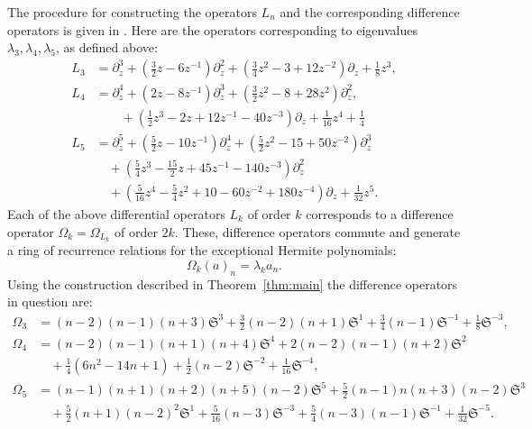 \documentclass{amsart}
\theoremstyle{definition}
\theoremstyle{remark}
\numberwithin{equation}{section}
\def\S{\mathfrak{S}}
\begin{document}
The procedure for constructing the operators $L_n$ and the
corresponding difference operators is given in
\cite{MilsonKasman2020}.  Here are the operators corresponding to
eigenvalues $\lambda_3,\lambda_4, \lambda_5$, as defined above:
\begin{align*}
  L_3
  &= \partial_z^3 + \left( \frac32 z-6 z^{-1}\right) \partial_z^2 +
    \left( \frac34 z^2 -3 + 12 z^{-2}\right) \partial_z + \frac18
    z^3,\\
  L_4
  &= \partial_z^4+\left(2z-8z^{-1}\right) \partial_z^3 + \left(
    \frac32 z^2 -8 + 28 z^2 \right) \partial_z^2, \\
  &\qquad + \left(\frac12 z^3
    -2z + 12 z^{-1} -40 z^{-3}\right) \partial_z +
    \frac1{16}z^4+\frac14\\
  L_5
  &= 
    \partial_z^5+
    \left(\frac52z-10z^{-1}\right) \partial_z^4+
    \left(\frac52z^2-15+50z^{-2}\right) \partial_z^3\\
  &\quad+
    \left(\frac54 z^3-\frac{15}{2} z+
    45z^{-1}-140z^{-3}\right) \partial_z^2\\
  &\quad+ \left(\frac{5}{16} z^4
    -\frac54 z^2+10-60z^{-2}+180z^{-4}\right)
    \partial_z +\frac{1}{32}z^5.
\end{align*}
Each of the above differential operators $L_k$ of order $k$
corresponds to a difference operator $\Omega_{k} = \Omega_{L_k}$ of
order $2k$.  These, difference operators commute and generate a ring
of  recurrence relations for the exceptional Hermite polynomials:
\begin{equation}
  \label{eq:recrel}
\Omega_{k}(a)_n=\lambda_k a_n.
\end{equation}
Using the construction described  in
Theorem~\ref{thm:main} the difference operators in question are:
\begin{align*}
  \Omega_3
  &=(n-2) (n-1) (n+3)
    \S^3+\frac{3}{2} (n-2) (n+1) \S^1+\frac{3}{4} (n-1)
    \S^{-1}+\frac18\S^{-3},\\
  \Omega_4
  &=
    (n-2) (n-1) (n+1) (n+4)
    \S^4+  2 (n-2) (n-1) 
    (n+2) \S^2\\
  &\quad +  \frac{1}{4} \left(6 n^2-14 n+1\right) 
    +\frac{1}{2}
    (n-2) \S^{-2}+\frac{1}{16}\S^{-4},\\
  \Omega_5
  &=
    (n-1) (n+1) (n+2) 
    (n+5) (n-2) \S^5+\frac{5}{2} (n-1) n (n+3) (n-2)
    \S^3\\
  &\quad +
    \frac{5}{2} (n+1) (n-2)^2 \S^1 +\frac{5}{16} (n-3)
    \S^{-3}+\frac{5}{4} (n-3) (n-1) 
    \S^{-1}+\frac{1}{32}\S^{-5}.
\end{align*}
\end{document}

